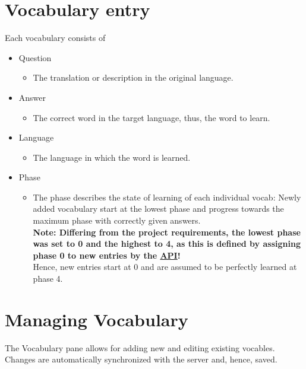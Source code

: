     \section{Vocabulary entry}
    Each vocabulary consists of
    \begin{itemize}
        \item Question
        \begin{itemize}
            \item The translation or description in the original language.
        \end{itemize}
        \item Answer
        \begin{itemize}
            \item The correct word in the target language, thus, the word to learn.
        \end{itemize}
        \item Language
        \begin{itemize}
            \item The language in which the word is learned.
        \end{itemize}
        \item Phase
        \begin{itemize}
            \item The phase describes the state of learning of each individual vocab: Newly added vocabulary start at the lowest phase and progress towards the maximum phase with correctly given answers.\\
            \textbf{Note: Differing from the project requirements, the lowest phase was set to 0 and the highest to 4, as this is defined by assigning phase 0 to new entries by the \href{https://api.voc5.org/}{API}!} \\
            Hence, new entries start at 0 and are assumed to be perfectly learned at phase 4.
        \end{itemize}
    \end{itemize}
    
    \section{Managing Vocabulary}
    The Vocabulary pane allows for adding new and editing existing vocables. Changes are automatically synchronized with the server and, hence, saved. \\
        
